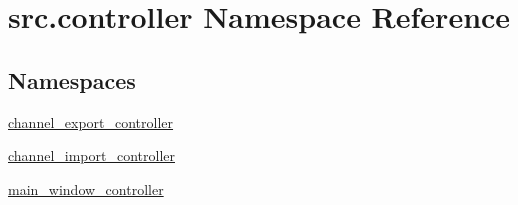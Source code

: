 \hypertarget{namespacesrc_1_1controller}{}\section{src.\+controller Namespace Reference}
\label{namespacesrc_1_1controller}
\subsection*{Namespaces}
\begin{DoxyCompactItemize}
\item 
 \hyperlink{namespacesrc_1_1controller_1_1channel__export__controller}{channel\+\_\+export\+\_\+controller}
\item 
 \hyperlink{namespacesrc_1_1controller_1_1channel__import__controller}{channel\+\_\+import\+\_\+controller}
\item 
 \hyperlink{namespacesrc_1_1controller_1_1main__window__controller}{main\+\_\+window\+\_\+controller}
\end{DoxyCompactItemize}
